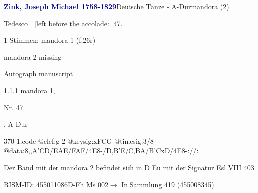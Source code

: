 \documentclass[twocolumn, 12pt]{book}
\begin{document}
\par \vspace{16pt} \textcolor{darkblue}{\textbf{Zink, Joseph Michael  1758-1829}}\hfillplus{\textbf{[370]}}\newline Deutsche Tänze - A-Dur\newline mandora (2)
\par \begin{itshape}[f.26r, at left:] Tedesco | [left before the accolade:] 47.\end{itshape} 
\par \textcolor{darkblue}{}  1 Stimmen: mandora 1  (f.26r)\newline \begin{small} mandora 2 missing\end{small} \newline Autograph manuscript
\par 1.1.1  mandora 1, \begin{itshape}Nr. 47.\end{itshape}, A-Dur  
\begin{filecontents*}{370-1.code}
@clef:g-2
@keysig:xFCG
@timesig:3/8
@data:8,,A'CD/EAE/FAF/4E8-/D,B'E/C,BA/B'CxD/4E8-://:
\end{filecontents*}
\newline %
\par Der Band mit der mandora 2 befindet sich in D Eu mit der Signatur Esl VIII 403
\par RISM-ID: 455011086\newline D-Fh  Ms 002\newline $\rightarrow$ In Sammlung 419 (455008345)
      
\end{document}
